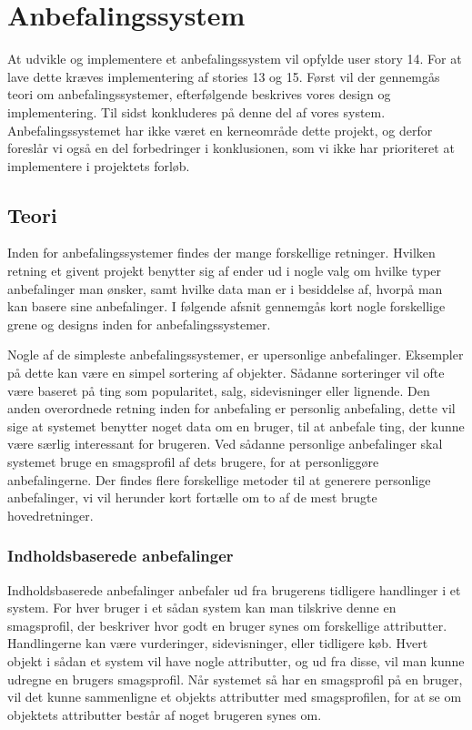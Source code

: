 \section{Anbefalingssystem}\label{anbefaling}
At udvikle og implementere et anbefalingssystem vil opfylde user story 14.
For at lave dette kræves implementering af stories 13 og 15.
Først vil der gennemgås teori om anbefalingssystemer, efterfølgende beskrives vores design og implementering.
Til sidst konkluderes på denne del af vores system.
Anbefalingssystemet har ikke været en kerneområde dette projekt, og derfor foreslår vi også en del forbedringer i konklusionen, som vi ikke har prioriteret at implementere i projektets forløb.

\subsection{Teori}
Inden for anbefalingssystemer findes der mange forskellige retninger.
Hvilken retning et givent projekt benytter sig af ender ud i nogle valg om hvilke typer anbefalinger man ønsker, samt hvilke data man er i besiddelse af, hvorpå man kan basere sine anbefalinger.
I følgende afsnit gennemgås kort nogle forskellige grene og designs inden for anbefalingssystemer.

Nogle af de simpleste anbefalingssystemer, er upersonlige anbefalinger.
Eksempler på dette kan være en simpel sortering af objekter.
Sådanne sorteringer vil ofte være baseret på ting som popularitet, salg, sidevisninger eller lignende.
Den anden overordnede retning inden for anbefaling er personlig anbefaling, dette vil sige at systemet benytter noget data om en bruger, til at anbefale ting, der kunne være særlig interessant for brugeren.
Ved sådanne personlige anbefalinger skal systemet bruge en smagsprofil af dets brugere, for at personliggøre anbefalingerne.
Der findes flere forskellige metoder til at generere personlige anbefalinger, vi vil herunder kort fortælle om to af de mest brugte hovedretninger\citep{RecommenderSystems}.

\subsubsection{Indholdsbaserede anbefalinger}
Indholdsbaserede anbefalinger anbefaler ud fra brugerens tidligere handlinger i et system.
For hver bruger i et sådan system kan man tilskrive denne en smagsprofil, der beskriver hvor godt en bruger synes om forskellige attributter.
Handlingerne kan være vurderinger, sidevisninger, eller tidligere køb.
Hvert objekt i sådan et system vil have nogle attributter, og ud fra disse, vil man kunne udregne en brugers smagsprofil.
Når systemet så har en smagsprofil på en bruger, vil det kunne sammenligne et objekts attributter med smagsprofilen, for at se om objektets attributter består af noget brugeren synes om.

